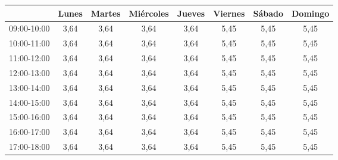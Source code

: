 \begin{table}[h]
\centering
\begin{tabular}{|c|c|c|c|c|c|c|c|}
\hline
\rowcolor[HTML]{DAE8FC} 
                                    & Lunes & Martes & Miércoles & Jueves & Viernes                       & Sábado                        & Domingo                       \\ \hline
\rowcolor[HTML]{9AFF99} 
\cellcolor[HTML]{DAE8FC}09:00-10:00 & 3,64  & 3,64   & 3,64      & 3,64   & \cellcolor[HTML]{34CDF9}5,45  & \cellcolor[HTML]{34CDF9}5,45  & \cellcolor[HTML]{34CDF9}5,45  \\ \hline
\rowcolor[HTML]{9AFF99} 
\cellcolor[HTML]{DAE8FC}10:00-11:00 & 3,64  & 3,64   & 3,64      & 3,64   & \cellcolor[HTML]{34CDF9}5,45  & \cellcolor[HTML]{34CDF9}5,45  & \cellcolor[HTML]{34CDF9}5,45  \\ \hline
\rowcolor[HTML]{9AFF99} 
\cellcolor[HTML]{DAE8FC}11:00-12:00 & 3,64  & 3,64   & 3,64      & 3,64   & \cellcolor[HTML]{34CDF9}5,45  & \cellcolor[HTML]{34CDF9}5,45  & \cellcolor[HTML]{34CDF9}5,45  \\ \hline
\rowcolor[HTML]{9AFF99} 
\cellcolor[HTML]{DAE8FC}12:00-13:00 & 3,64  & 3,64   & 3,64      & 3,64   & \cellcolor[HTML]{34CDF9}5,45  & \cellcolor[HTML]{34CDF9}5,45  & \cellcolor[HTML]{34CDF9}5,45  \\ \hline
\rowcolor[HTML]{9AFF99} 
\cellcolor[HTML]{DAE8FC}13:00-14:00 & 3,64  & 3,64   & 3,64      & 3,64   & \cellcolor[HTML]{34CDF9}5,45  & \cellcolor[HTML]{34CDF9}5,45  & \cellcolor[HTML]{34CDF9}5,45  \\ \hline
\rowcolor[HTML]{9AFF99} 
\cellcolor[HTML]{DAE8FC}14:00-15:00 & 3,64  & 3,64   & 3,64      & 3,64   & \cellcolor[HTML]{34CDF9}5,45  & \cellcolor[HTML]{34CDF9}5,45  & \cellcolor[HTML]{34CDF9}5,45  \\ \hline
\rowcolor[HTML]{9AFF99} 
\cellcolor[HTML]{DAE8FC}15:00-16:00 & 3,64  & 3,64   & 3,64      & 3,64   & \cellcolor[HTML]{34CDF9}5,45  & \cellcolor[HTML]{34CDF9}5,45  & \cellcolor[HTML]{34CDF9}5,45  \\ \hline
\rowcolor[HTML]{9AFF99} 
\cellcolor[HTML]{DAE8FC}16:00-17:00 & 3,64  & 3,64   & 3,64      & 3,64   & \cellcolor[HTML]{34CDF9}5,45  & \cellcolor[HTML]{34CDF9}5,45  & \cellcolor[HTML]{34CDF9}5,45  \\ \hline
\rowcolor[HTML]{9AFF99} 
\cellcolor[HTML]{DAE8FC}17:00-18:00 & 3,64  & 3,64   & 3,64      & 3,64   & \cellcolor[HTML]{34CDF9}5,45  & \cellcolor[HTML]{34CDF9}5,45  & \cellcolor[HTML]{34CDF9}5,45  \\ \hline

\end{tabular}
\end{table}
